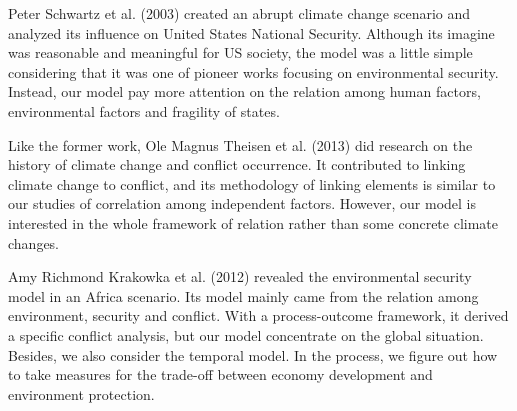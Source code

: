 Peter Schwartz et al. (2003) created an abrupt climate change scenario and analyzed its influence on United States National Security. Although its imagine was reasonable and meaningful for US society, the model was a little simple considering that it was one of pioneer works focusing on environmental security. Instead, our model pay more attention on the relation among human factors, environmental factors and fragility of states.

Like the former work, Ole Magnus Theisen et al. (2013) did research on the history of climate change and conflict occurrence. It contributed to linking climate change to conflict, and its methodology of linking elements is similar to our studies of correlation among independent factors. However, our model is interested in the whole framework of relation rather than some concrete climate changes.

Amy Richmond Krakowka et al. (2012) revealed the environmental security model in an Africa scenario. Its model mainly came from the relation among environment, security and conflict. With a process-outcome framework, it derived a specific conflict analysis, but our model concentrate on the global situation. Besides, we also consider the temporal model. In the process, we figure out how to take measures for the trade-off between economy development and environment protection.
